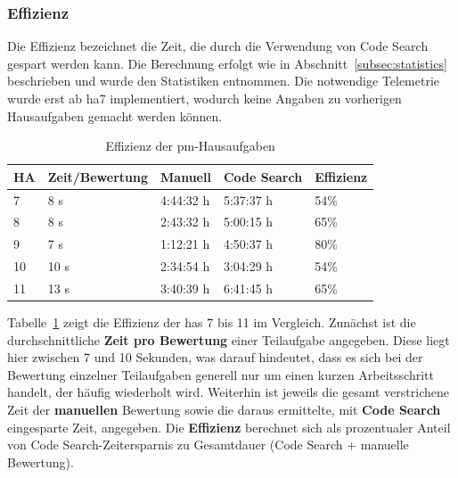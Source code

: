 \subsubsection{Effizienz}

Die Effizienz bezeichnet die Zeit, die durch die Verwendung von Code Search gespart werden kann.
Die Berechnung erfolgt wie in Abschnitt~\ref{subsec:statistics} beschrieben und wurde den Statistiken entnommen.
Die notwendige Telemetrie wurde erst ab \ac{ha}7 implementiert, wodurch keine Angaben zu vorherigen Hausaufgaben gemacht werden können.

\begin{table}
    \centering
    \caption{Effizienz der \ac{pm}-Hausaufgaben}
    \begin{tabular}{|l|l|l|l|l|}
    \hline
        HA  & Zeit/Bewertung & Manuell & Code Search & Effizienz \\ \hline
        7   &  8 s & 4:44:32 h & 5:37:37 h & 54\% \\ \hline
        8   &  8 s & 2:43:32 h & 5:00:15 h & 65\% \\ \hline
        9   &  7 s & 1:12:21 h & 4:50:37 h & 80\% \\ \hline
        10  & 10 s & 2:34:54 h & 3:04:29 h & 54\% \\ \hline
        11  & 13 s & 3:40:39 h & 6:41:45 h & 65\% \\ \hline
    \end{tabular}
    \label{tbl:pm-efficiency}
\end{table}

Tabelle~\ref{tbl:pm-efficiency} zeigt die Effizienz der \acp{ha} 7 bis 11 im Vergleich.
Zunächst ist die durchschnittliche \textbf{Zeit pro Bewertung} einer Teilaufgabe angegeben.
Diese liegt hier zwischen 7 und 10 Sekunden, was darauf hindeutet, dass es sich bei der Bewertung einzelner Teilaufgaben generell nur um einen kurzen Arbeitsschritt handelt, der häufig wiederholt wird.
Weiterhin ist jeweils die gesamt verstrichene Zeit der \textbf{manuellen} Bewertung sowie die daraus ermittelte, mit \textbf{Code Search} eingesparte Zeit, angegeben.
Die \textbf{Effizienz} berechnet sich als prozentualer Anteil von Code Search-Zeitersparnis zu Gesamtdauer (Code Search + manuelle Bewertung).

